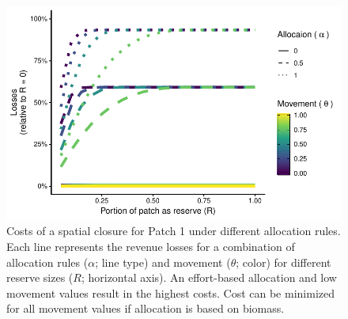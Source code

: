 \documentclass[12pt]{article}
\begin{document}
\begin{figure}[htbp]
\centering
\includegraphics{img/allocation_cost_plot.pdf}
\caption{\label{fig:allocation_cost_plot}Costs of a spatial closure for Patch 1 under different allocation rules. Each line represents the revenue losses for a combination of allocation rules ($\alpha$; line type) and movement ($\theta$; color) for different reserve sizes ($R$; horizontal axis). An effort-based allocation and low movement values result in the highest costs. Cost can be minimized for all movement values if allocation is based on biomass.}
\end{figure}
\end{document}
